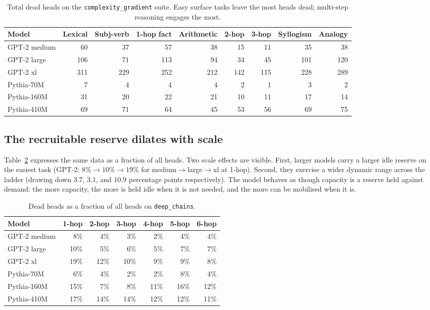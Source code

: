 \documentclass[11pt]{article}
\begin{document}
\begin{table}[h]
\centering
\caption{Total dead heads on the \texttt{complexity\_gradient} suite. Easy
surface tasks leave the most heads dead; multi-step reasoning engages the most.}
\label{tab:cg-total}
\scriptsize
\begin{tabular}{lrrrrrrrr}
\toprule
Model & Lexical & Subj-verb & 1-hop fact & Arithmetic & 2-hop & 3-hop & Syllogism & Analogy \\
\midrule
GPT-2 medium & 60 & 37 & 57 & 38 & 15 & 11 & 35 & 38 \\
GPT-2 large & 106 & 71 & 113 & 94 & 34 & 45 & 101 & 120 \\
GPT-2 xl & 311 & 229 & 252 & 212 & 142 & 115 & 228 & 289 \\
Pythia-70M & 7 & 4 & 4 & 4 & 2 & 1 & 3 & 2 \\
Pythia-160M & 31 & 20 & 22 & 21 & 10 & 11 & 17 & 14 \\
Pythia-410M & 69 & 71 & 64 & 45 & 53 & 56 & 69 & 75 \\
\bottomrule
\end{tabular}
\end{table}

\subsection{The recruitable reserve dilates with scale}\label{sec:scale}
Table~\ref{tab:dc-frac} expresses the same data as a fraction of all heads.
Two scale effects are visible. First, larger models carry a larger idle
reserve on the easiest task (GPT-2: $8\%\to10\%\to19\%$ for
medium$\to$large$\to$xl at 1-hop). Second, they exercise a wider dynamic
range across the ladder (drawing down $3.7$, $3.1$, and $10.9$ percentage
points respectively). The model behaves as though capacity is a reserve held
against demand: the more capacity, the more is held idle when it is not
needed, and the more can be mobilised when it is.

\begin{table}[h]
\centering
\caption{Dead heads as a fraction of all heads on \texttt{deep\_chains}.}
\label{tab:dc-frac}
\small
\begin{tabular}{lrrrrrr}
\toprule
Model & 1-hop & 2-hop & 3-hop & 4-hop & 5-hop & 6-hop \\
\midrule
GPT-2 medium & 8\% & 4\% & 3\% & 2\% & 4\% & 4\% \\
GPT-2 large & 10\% & 5\% & 6\% & 5\% & 7\% & 7\% \\
GPT-2 xl & 19\% & 12\% & 10\% & 9\% & 9\% & 8\% \\
Pythia-70M & 6\% & 4\% & 2\% & 2\% & 8\% & 4\% \\
Pythia-160M & 15\% & 7\% & 8\% & 11\% & 16\% & 12\% \\
Pythia-410M & 17\% & 14\% & 14\% & 12\% & 12\% & 11\% \\
\bottomrule
\end{tabular}
\end{table}
\end{document}
